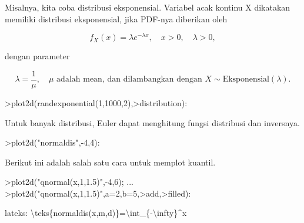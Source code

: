 \documentclass[a4paper,10pt]{article}
\begin{document}
\begin{eulernotebook}
\begin{eulercomment}
\begin{eulercomment}
\begin{eulercomment}
\begin{eulercomment}
\begin{eulercomment}
\begin{eulercomment}
\begin{eulercomment}
\begin{eulercomment}
\begin{eulercomment}
\begin{eulercomment}
\begin{eulercomment}
\begin{eulercomment}
\begin{eulercomment}
\begin{eulercomment}
\begin{eulercomment}
\begin{eulercomment}
\begin{eulercomment}
\begin{eulercomment}
\begin{eulercomment}
\begin{eulercomment}
\begin{eulercomment}
\begin{eulercomment}
\begin{eulercomment}
\begin{eulercomment}
\begin{eulercomment}
\begin{eulercomment}
\begin{eulercomment}
\begin{eulercomment}
\begin{eulercomment}
\begin{eulercomment}
\begin{eulercomment}
\begin{eulercomment}
\begin{eulercomment}
Misalnya, kita coba distribusi eksponensial. Variabel acak kontinu X
dikatakan memiliki distribusi eksponensial, jika PDF-nya diberikan
oleh\\
\end{eulercomment}
\begin{eulerformula}
\[
f_X(x)=\lambda e^{-\lambda x},\quad x>0,\quad \lambda>0,
\]
\end{eulerformula}
\begin{eulercomment}
dengan parameter\\
\end{eulercomment}
\begin{eulerformula}
\[
\lambda=\frac{1}{\mu},\quad \mu \text{ adalah mean, dan dilambangkan dengan } X \sim \text{Eksponensial}(\lambda).
\]
\end{eulerformula}
\begin{eulerprompt}
>plot2d(randexponential(1,1000,2),>distribution):
\end{eulerprompt}
\begin{eulercomment}
Untuk banyak distribusi, Euler dapat menghitung fungsi distribusi dan
inversnya.
\end{eulercomment}
\begin{eulerprompt}
>plot2d("normaldis",-4,4): 
\end{eulerprompt}
\begin{eulercomment}
Berikut ini adalah salah satu cara untuk memplot kuantil.
\end{eulercomment}
\begin{eulerprompt}
>plot2d("qnormal(x,1,1.5)",-4,6);  ...
>plot2d("qnormal(x,1,1.5)",a=2,b=5,>add,>filled):
\end{eulerprompt}
\begin{eulercomment}
lateks: \textbackslash{}teks\{normaldis(x,m,d)\}=\textbackslash{}int\_\{-\textbackslash{}infty\}\textasciicircum{}x

\end{eulercomment}
\end{eulercomment}
\end{eulercomment}
\end{eulercomment}
\end{eulercomment}
\end{eulercomment}
\end{eulercomment}
\end{eulercomment}
\end{eulercomment}
\end{eulercomment}
\end{eulercomment}
\end{eulercomment}
\end{eulercomment}
\end{eulercomment}
\end{eulercomment}
\end{eulercomment}
\end{eulercomment}
\end{eulercomment}
\end{eulercomment}
\end{eulercomment}
\end{eulercomment}
\end{eulercomment}
\end{eulercomment}
\end{eulercomment}
\end{eulercomment}
\end{eulercomment}
\end{eulercomment}
\end{eulercomment}
\end{eulercomment}
\end{eulercomment}
\end{eulercomment}
\end{eulercomment}
\end{eulercomment}
\end{eulernotebook}
\end{document}
